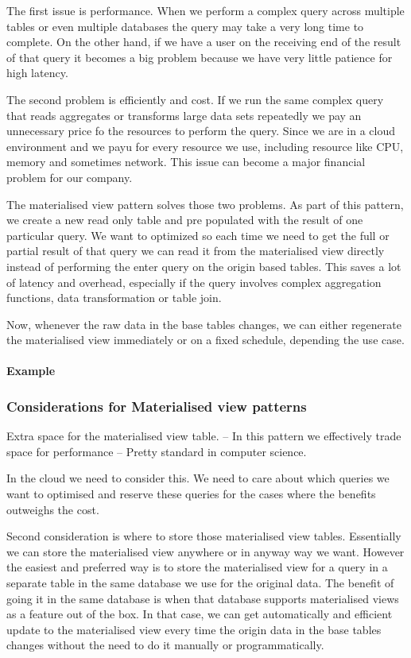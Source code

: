 The first issue is performance.
When we perform a complex query across multiple tables or even multiple databases the query may take a very long time to complete.
On the other hand, if we have a user on the receiving end of the result of that query it becomes a big problem because we have very little patience for high latency.

The second problem is efficiently and cost.
If we run the same complex query that reads aggregates or transforms large data sets repeatedly we pay an unnecessary price fo the resources to perform the query.
Since we are in a cloud environment and we payu for every resource we use, including resource like CPU, memory and sometimes network.
This issue can become a major financial problem for our company.

The materialised view pattern solves those two problems.
As part of this pattern, we create a new read only table and pre populated with the result of one particular query.
We want to optimized so each time we need to get the full or partial result of that query we can read it from the materialised view directly instead of performing the enter query on the origin based tables.
This saves a lot of latency and overhead, especially if the query involves complex aggregation functions, data transformation or table join.

Now, whenever the raw data in the base tables changes, we can either regenerate the materialised view immediately or on a fixed schedule, depending the use case.

\paragraph{Example}

\subsubsection{Considerations for Materialised view patterns}
Extra space for the materialised view table.
-- In this pattern we effectively trade space for performance
-- Pretty standard in computer science.

In the cloud we need to consider this.
We need to care about which queries we want to optimised and reserve these queries for the cases where the benefits outweighs the cost.

Second consideration is where to store those materialised view tables.
Essentially we can store the materialised view anywhere or in anyway way we want.
However the easiest and preferred way is to store the materialised view for a query in a separate table in the same database we use for the original data.
The benefit of going it in the same database is when that database supports materialised views as a feature out of the box.
In that case, we can get automatically and efficient update to the materialised view every time the origin data in the base tables changes without the need to do it manually or programmatically.

